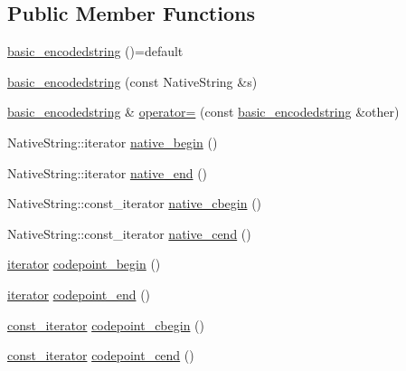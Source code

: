 \subsection*{Public Member Functions}
\begin{DoxyCompactItemize}
\item 
\hyperlink{classu5e_1_1basic__encodedstring_aa7d1d23500978ade5927cfa279c3e6fd}{basic\+\_\+encodedstring} ()=default
\item 
\hyperlink{classu5e_1_1basic__encodedstring_a2a6405334c282118a3607d9ada1568c3}{basic\+\_\+encodedstring} (const Native\+String \&s)
\item 
\hyperlink{classu5e_1_1basic__encodedstring}{basic\+\_\+encodedstring} \& \hyperlink{classu5e_1_1basic__encodedstring_a69d3205b0a9c0b0050eb55e9ffadec6f}{operator=} (const \hyperlink{classu5e_1_1basic__encodedstring}{basic\+\_\+encodedstring} \&other)
\end{DoxyCompactItemize}
{\bf }\par
\begin{DoxyCompactItemize}
\item 
Native\+String\+::iterator \hyperlink{classu5e_1_1basic__encodedstring_adc6a9c61efa6382f7e51e395d24f4cfe}{native\+\_\+begin} ()
\item 
Native\+String\+::iterator \hyperlink{classu5e_1_1basic__encodedstring_af54b77b3ff0eb0a2fb635c4df165df54}{native\+\_\+end} ()
\item 
Native\+String\+::const\+\_\+iterator \hyperlink{classu5e_1_1basic__encodedstring_aebe88902bf87cf621765e2ea064b01c4}{native\+\_\+cbegin} ()
\item 
Native\+String\+::const\+\_\+iterator \hyperlink{classu5e_1_1basic__encodedstring_a8ef364adc67eec590eae8ee847f30d79}{native\+\_\+cend} ()
\end{DoxyCompactItemize}

{\bf }\par
\begin{DoxyCompactItemize}
\item 
\hyperlink{classu5e_1_1basic__encodedstring_a6657b5ba8bb502ff86626bffe324aae6}{iterator} \hyperlink{classu5e_1_1basic__encodedstring_ab07f01768823bdf39dfdaac0dada5775}{codepoint\+\_\+begin} ()
\item 
\hyperlink{classu5e_1_1basic__encodedstring_a6657b5ba8bb502ff86626bffe324aae6}{iterator} \hyperlink{classu5e_1_1basic__encodedstring_a02b5965403773072209311320a5485e1}{codepoint\+\_\+end} ()
\item 
\hyperlink{classu5e_1_1basic__encodedstring_a249da58e8bad9c91fab547516f90c60d}{const\+\_\+iterator} \hyperlink{classu5e_1_1basic__encodedstring_ac1809651d897f7de1daf84eacbb26acf}{codepoint\+\_\+cbegin} ()
\item 
\hyperlink{classu5e_1_1basic__encodedstring_a249da58e8bad9c91fab547516f90c60d}{const\+\_\+iterator} \hyperlink{classu5e_1_1basic__encodedstring_a528612717377edb02f7610d3c8a600ed}{codepoint\+\_\+cend} ()
\end{DoxyCompactItemize}

